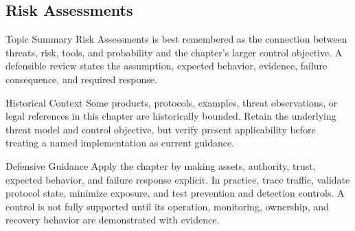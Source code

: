 \documentclass[11pt,letterpaper]{article}
\begin{document}
\subsection*{Risk Assessments}
\begin{CornellNotesTable}
\end{CornellNotesTable}
\begin{CornellSummaryBox}{Topic Summary}
Risk Assessments is best remembered as the connection between threats, risk, tools, and probability and the chapter's larger control objective. A defensible review states the assumption, expected behavior, evidence, failure consequence, and required response.
\end{CornellSummaryBox}
\begin{CornellWarningBox}{Historical Context}
Some products, protocols, examples, threat observations, or legal references in this chapter are historically bounded. Retain the underlying threat model and control objective, but verify present applicability before treating a named implementation as current guidance.
\end{CornellWarningBox}
\begin{CornellOverviewBox}{Defensive Guidance}
Apply the chapter by making assets, authority, trust, expected behavior, and failure response explicit. In practice, trace traffic, validate protocol state, minimize exposure, and test prevention and detection controls. A control is not fully supported until its operation, monitoring, ownership, and recovery behavior are demonstrated with evidence.
\end{CornellOverviewBox}
\end{document}
